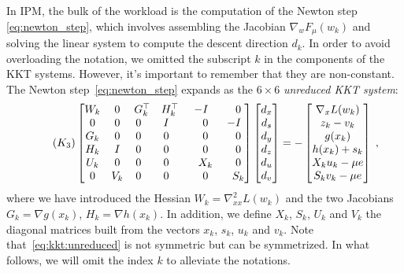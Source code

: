 In IPM, the bulk of the workload is the computation of the Newton
step \eqref{eq:newton_step}, which involves assembling the Jacobian
$\nabla_w F_\mu(w_k)$ and solving the linear system to compute
the descent direction $d_k$.
In order to avoid overloading the notation, we omitted the subscript $k$ in the components of the KKT systems. However, it's important to remember that they are non-constant.
The Newton step~\eqref{eq:newton_step} expands as the $6 \times 6$
\emph{unreduced KKT system}:
\begin{equation}
  \label{eq:kkt:unreduced}
  \setlength\arraycolsep{5pt}
  \tag{$K_3$}
  \begin{bmatrix}
    W_k & 0 & G_k^\top           & H_k^\top           & -I           & \phantom{-}0 \\
    0 & 0 & 0\phantom{^\top} & I\phantom{^\top} & \phantom{-}0 & -I           \\
    G_k & 0 & 0\phantom{^\top} & 0\phantom{^\top} & \phantom{-}0 & \phantom{-}0 \\
    H_k & I & 0\phantom{^\top} & 0\phantom{^\top} & \phantom{-}0 & \phantom{-}0 \\
    U_k & 0 & 0\phantom{^\top} & 0\phantom{^\top} & \phantom{-}X_k & \phantom{-}0 \\
    0 & V_k & 0\phantom{^\top} & 0\phantom{^\top} & \phantom{-}0 & \phantom{-}S_k
  \end{bmatrix}
  \begin{bmatrix}
    d_x \\
    d_s \\
    d_y \\
    d_z \\
    d_u \\
    d_v
  \end{bmatrix}
  = - \begin{bmatrix}
    \nabla_x L(w_k) \\
       z_k - v_k  \\
       g(x_k)  \\
       h(x_k) + s_k  \\
       X_k u_k - \mu e  \\
       S_k v_k - \mu e
  \end{bmatrix} \; ,
\end{equation}
where we have introduced the Hessian $W_k = \nabla^2_{x x} L(w_k)$ and
the two Jacobians $G_k = \nabla g(x_k)$, $H_k = \nabla h(x_k)$.
In addition, we define $X_k$, $S_k$, $U_k$ and $V_k$ the diagonal matrices built from the vectors $x_k$, $s_k$, $u_k$ and $v_k$.
Note that~\eqref{eq:kkt:unreduced} is not symmetric but can be symmetrized.
In what follows, we will omit the index $k$ to alleviate the notations.

